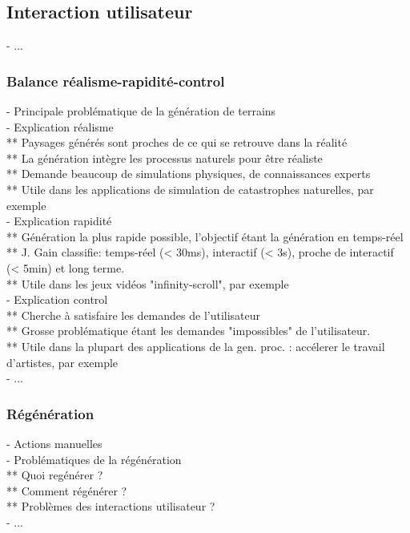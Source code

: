 \subsection{Interaction utilisateur}
- ...

\subsubsection{Balance réalisme-rapidité-control}
- Principale problématique de la génération de terrains \\
- Explication réalisme \\
** Paysages générés sont proches de ce qui se retrouve dans la réalité \\
** La génération intègre les processus naturels pour être réaliste \\
** Demande beaucoup de simulations physiques, de connaissances experts \\
** Utile dans les applications de simulation de catastrophes naturelles, par exemple \\
- Explication rapidité \\
** Génération la plus rapide possible, l'objectif étant la génération en temps-réel \\
** J. Gain classifie: temps-réel (< 30ms), interactif (< 3s), proche de interactif (< 5min) et long terme. \\
** Utile dans les jeux vidéos "infinity-scroll", par exemple\\
- Explication control \\
** Cherche à satisfaire les demandes de l'utilisateur \\
** Grosse problématique étant les demandes "impossibles" de l'utilisateur. \\
** Utile dans la plupart des applications de la gen. proc. : accélerer le travail d'artistes, par exemple \\
- ...

\subsubsection{Régénération}
- Actions manuelles \\
- Problématiques de la régénération \\
** Quoi regénérer ? \\
** Comment régénérer ? \\
** Problèmes des interactions utilisateur ? \\
- ...



